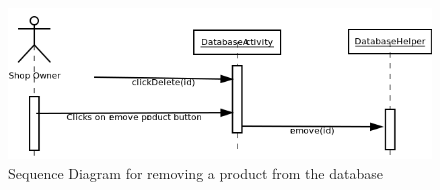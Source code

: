 \documentclass{report}
\begin{document}
\begin{figure}[H]
		\centering
		\includegraphics[width=\textwidth]{sequencediagram2.png}
		\caption{Sequence Diagram for removing a product from the database}
		\label{fig:Sequence Diagram 2}
\end{figure}
\end{document}
